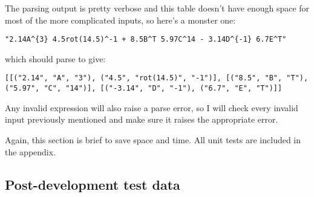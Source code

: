 \documentclass[../main.tex]{subfiles}
\begin{document}
The parsing output is pretty verbose and this table doesn't have enough space for most of the more complicated inputs, so here's a monster one:
\begin{center}
\texttt{"2.14A\textasciicircum\{3\} 4.5rot(14.5)\textasciicircum-1 + 8.5B\textasciicircum T 5.97C\textasciicircum14 - 3.14D\textasciicircum\{-1\} 6.7E\textasciicircum T"}
\end{center}
which should parse to give:
\begin{center}
\texttt{[[("2.14", "A", "3"), ("4.5", "rot(14.5)", "-1")], [("8.5", "B", "T"), ("5.97", "C", "14")], [("-3.14", "D", "-1"), ("6.7", "E", "T")]]}
\end{center}

Any invalid expression will also raise a parse error, so I will check every invalid input previously mentioned and make sure it raises the appropriate error.

Again, this section is brief to save space and time. All unit tests are included in the appendix.

\subsection{Post-development test data\label{subsection:post-development-test-data}}

\end{document}
